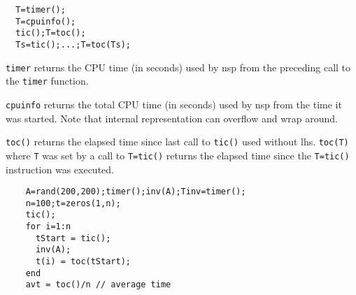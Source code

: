 \begin{mandesc}
\end{mandesc}
\begin{calling_sequence}
\begin{verbatim}
  T=timer();
  T=cpuinfo();
  tic();T=toc();
  Ts=tic();...;T=toc(Ts);
\end{verbatim}
\end{calling_sequence}
\begin{mandescription}
  \verb!timer!  returns the CPU time (in seconds) used by nsp from the 
  preceding call to the \verb!timer! function. 

  \verb!cpuinfo! returns the total CPU time (in seconds) used by nsp 
  from the time it was started. Note that internal representation
  can overflow and wrap around.

  \verb!toc()! returns the elapsed time since last call to \verb!tic()!
  used without lhs. \verb!toc(T)! where \verb!T! was set by a call to 
  \verb!T=tic()! returns the elapsed time since the \verb!T=tic()! 
  instruction was executed. 
\end{mandescription}
\begin{examples}
  \begin{Verbatim}
    A=rand(200,200);timer();inv(A);Tinv=timer();
    n=100;t=zeros(1,n);
    tic();
    for i=1:n 
      tStart = tic();
      inv(A);
      t(i) = toc(tStart);
    end
    avt = toc()/n // average time 
  \end{Verbatim}
\end{examples}

